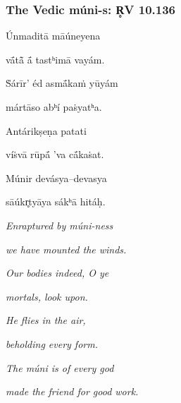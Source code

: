 \documentclass[pdf]{beamer}
\begin{document}
\begin{frame} \frametitle{The Vedic múni-s: R̥V 10.136}
\begin{center}
\begin{multicols}{2}
\scriptsize{
	Únmaditā māúneyena

	vā́tā̃ ā́ tastʰimā vayám.

	Ṡárīr' éd asmā́kaṁ yūyám

	mártāso abʰí paṡyatʰa.

	\vspace{12pt}

	Antárikṣeṇa patati

	víṡvā rūpā́ 'va cā́kaṡat.

	Múnir devásya--devasya

	sāúkr̥tyāya sákʰā hitáḥ.

	\columnbreak

	\textit{Enraptured by múni-ness}

	\textit{we have mounted the winds.}

	\textit{Our bodies indeed, O ye}

	\textit{mortals, look upon.}

	\vspace{12pt}

	\textit{He flies in the air,}

	\textit{beholding every form.}

	\textit{The múni is of every god}

	\textit{made the friend for good work.}
}
\end{multicols}
\end{center}
\end{frame}


\end{document}
